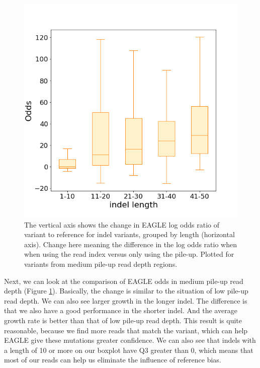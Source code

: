 \begin{figure}[H]
    \centering
    \includegraphics[width=0.6\columnwidth]{body/image/mid_odds_change.png}
    \captionsetup{labelfont=bf}
    \renewcommand{\baselinestretch}{1.0}
    \caption[medium pile-up read depth odds change ratio]{The vertical axis shows the change in EAGLE log odds ratio of variant to reference for indel variants, grouped by length (horizontal axis).  Change here meaning the difference in the log odds ratio when when using the read index versus only using the pile-up.  Plotted for variants from medium pile-up read depth regions.}
    \label{mid_odds_change}
\end{figure}

Next, we can look at the comparison of EAGLE odds in medium pile-up read depth (Figure \ref{mid_odds_change}). Basically, the change is similar to the situation of low pile-up read depth. We can also see larger growth in the longer indel. The difference is that we also have a good performance in the shorter indel. And the average growth rate is better than that of low pile-up read depth. This result is quite reasonable, because we find more reads that match the variant, which can help EAGLE give these mutations greater confidence.
We can also see that indels with a length of 10 or more on our boxplot have Q3 greater than 0, which means that most of our reads can help us eliminate the influence of reference bias.

